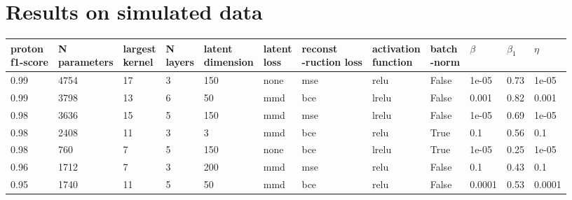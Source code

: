 \chapter{Results on simulated data}
\setlength{\LTleft}{-0.9in}
\begin{longtable}{llllllllllll}
\toprule
\MyHead{0.7cm}{proton\\f1-score} & \MyHead{1.8cm}{N \\parameters} & \MyHead{0.9cm}{largest\\kernel} & \MyHead{0.6cm}{N\\layers} & \MyHead{1.5cm}{latent\\ dimension} & \MyHead{0.6cm}{latent\\loss} &\MyHead{1.5cm}{reconst\\-ruction loss} & \MyHead{2cm}{activation\\function} & \MyHead{1.5cm}{batch\\-norm} & $\beta$ & $\beta_1$ &  $\eta$  \\
\midrule \endhead
           0.99 &         4754 &             17 &        3 &              150 &        none &                 mse &                relu &     False &   1e-05 &      0.73 &  1e-05 \\
           0.99 &         3798 &             13 &        6 &               50 &         mmd &                 bce &               lrelu &     False &   0.001 &      0.82 &  0.001 \\
           0.98 &         3636 &             15 &        5 &              150 &         mmd &                 mse &               lrelu &     False &   1e-05 &      0.69 &  1e-05 \\
           0.98 &         2408 &             11 &        3 &                3 &         mmd &                 bce &                relu &      True &     0.1 &      0.56 &    0.1 \\
           0.98 &          760 &              7 &        5 &              150 &        none &                 bce &               lrelu &      True &   1e-05 &      0.25 &  1e-05 \\
           0.96 &         1712 &              7 &        3 &              200 &         mmd &                 mse &                relu &     False &     0.1 &      0.43 &    0.1 \\
           0.95 &         1740 &             11 &        5 &               50 &         mmd &                 bce &                relu &     False &  0.0001 &      0.53 & 0.0001 \\

\end{longtable}
